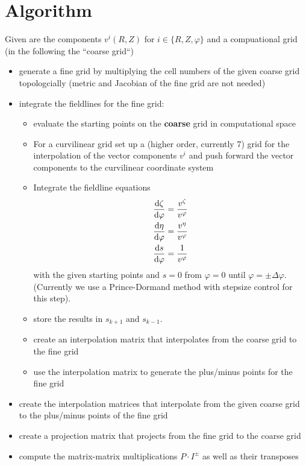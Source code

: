\section{Algorithm}
Given are the components $v^i(R,Z)$ for $i\in\{R,Z,\varphi\}$ and a compuational grid (in the following the ``coarse grid``)
\begin{itemize}
  \item generate a fine grid by multiplying the cell numbers of the given coarse grid topologcially (metric and Jacobian of the fine grid are not needed)
  \item integrate the fieldlines for the fine grid:
    \begin{itemize}
      \item evaluate the starting points on the \textbf{coarse} grid in computational space
      \item For a curvilinear grid set up a (higher order, currently 7) grid for the
        interpolation of the vector components $v^i$ and push forward the vector components
        to the curvilinear coordinate system
      \item Integrate the fieldline equations
\begin{subequations}
\begin{align}
\frac{\mathrm{d} \zeta}{\mathrm{d}\varphi} &= \frac{v^\zeta}{v^\varphi}\\
\frac{\mathrm{d} \eta}{\mathrm{d}\varphi} &= \frac{v^\eta}{v^\varphi} \\
\frac{\mathrm{d} s}{\mathrm{d}\varphi} &= \frac{1}{v^\varphi}
\end{align}
\label{eq:fieldlines_converted}
\end{subequations}
    with the given starting points and $s=0$ from $\varphi=0$ until $\varphi = \pm\Delta \varphi$. (Currently we use a Prince-Dormand method with stepsize control for this step).
      \item store the results in $s_{k+1}$ and $s_{k-1}$.
      \item create an interpolation matrix that interpolates from the coarse grid
        to the fine grid
      \item use the interpolation matrix to generate the plus/minus points for the fine grid
    \end{itemize}
  \item create the interpolation matrices that interpolate from the given coarse grid
    to the plus/minus points of the fine grid
  \item create a projection matrix that projects from the fine grid to the coarse grid
  \item compute the matrix-matrix multiplications $P\cdot I^\pm$ as well as their transposes
\end{itemize}

